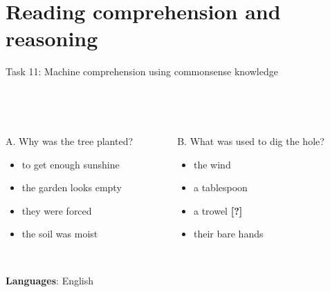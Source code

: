 \documentclass[10pt, compress]{beamer}
\begin{document}



\section{Reading comprehension and reasoning}

\begin{frame}{Task 11: Machine comprehension using commonsense knowledge}
 

~\\
~\\

\begin{columns}
  \begin{column}{0.5\textwidth}
   \alert<2>{A. Why was the tree planted?}
      \begin{itemize}
      \item    to get enough sunshine
      \item    \alert<2>{the garden looks empty}
      \item    they were forced
      \item    the soil was moist
      \end{itemize}
  \end{column}
  \begin{column}{0.5\textwidth}
   \alert<3>{B. What was used to dig the hole?}
      \begin{itemize}
      \item    the wind
      \item    a tablespoon
      \item    \alert<3>{a trowel} \textbf{[?]}
      \item    their bare hands
      \end{itemize}
  \end{column}
\end{columns}

~\\

\textbf{Languages}: English

\end{frame}
\end{document}
